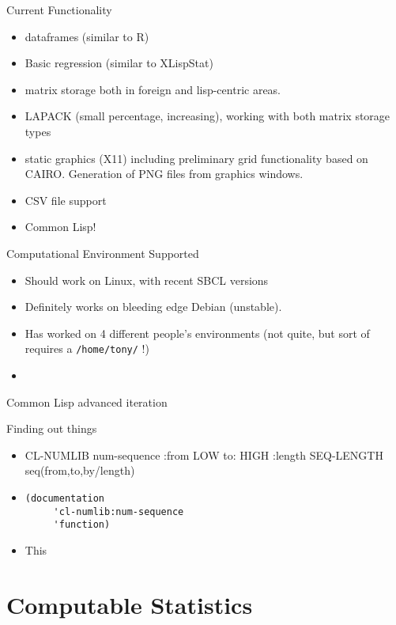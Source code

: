 \documentclass{beamer}
\begin{document}
\begin{frame}{Current Functionality}
  \begin{itemize}
  \item dataframes (similar to R)
  \item Basic regression (similar to XLispStat)
  \item matrix storage both in foreign and lisp-centric areas.
  \item LAPACK (small percentage, increasing), working with both
    matrix storage types
  \item static graphics (X11) including preliminary grid functionality based
    on CAIRO.  Generation of PNG files from graphics windows.
  \item CSV file support
  \item Common Lisp!
  \end{itemize}
\end{frame}

\begin{frame}{Computational Environment Supported}
  \begin{itemize}
  \item Should  work on Linux, with recent SBCL versions
  \item Definitely works on bleeding edge Debian (unstable).
  \item Has worked on 4 different people's environments (not quite,
    but sort of requires a \verb+/home/tony/+ !)
  \item 
  \end{itemize}
\end{frame}

\begin{frame}{Common Lisp}
  advanced iteration
\end{frame}


\begin{frame}[fragile]{Finding out things}
  \begin{itemize}
  \item CL-NUMLIB
     num-sequence :from LOW to: HIGH :length SEQ-LENGTH 
     seq(from,to,by/length)
   \item
\begin{verbatim}
(documentation
     'cl-numlib:num-sequence
     'function)
\end{verbatim}
   \item This
  \end{itemize}
\end{frame}


\section{Computable Statistics}
\end{document}
